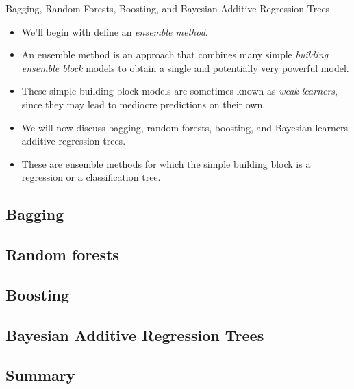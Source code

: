 \begin{frame}{Bagging, Random Forests, Boosting, and Bayesian Additive Regression Trees}
\begin{itemize}

    \item We'll begin with define an \textit{ensemble method}. \pause 
    
    \item An ensemble method is an approach that combines many simple \textit{building ensemble block} models to obtain a single and potentially very powerful model. \pause 
    \item These simple building block models are sometimes known as \textit{weak learners}, since they may lead to mediocre predictions on their own. \pause 

    \item We will now discuss bagging, random forests, boosting, and Bayesian learners additive regression trees. \pause 
    
    \item These are ensemble methods for which the simple building block is a regression or a classification tree. 
\end{itemize}


\end{frame}

\subsection{Bagging}


\subsection{Random forests}


\subsection{Boosting}


\subsection{Bayesian Additive Regression Trees}


\subsection{Summary}
